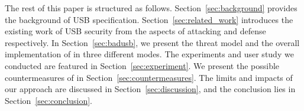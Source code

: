 The rest of this paper is structured as follows.  Section~\ref{sec:background}
provides the background of \ac{USB} specification.  Section~\ref{sec:related_work}
introduces the existing work of \ac{USB} security from the aspects of attacking and
defense respectively.  In Section~\ref{sec:badusb}, we present the threat model
and the overall implementation of \tool in three different modes.  The
experiments and user study we conducted are featured in
Section~\ref{sec:experiment}.  We present the possible countermeasures of \tool
in Section~\ref{sec:countermeasures}.  The limits and impacts of our approach
are discussed in Section~\ref{sec:discussion}, and the conclusion lies in
Section~\ref{sec:conclusion}.














